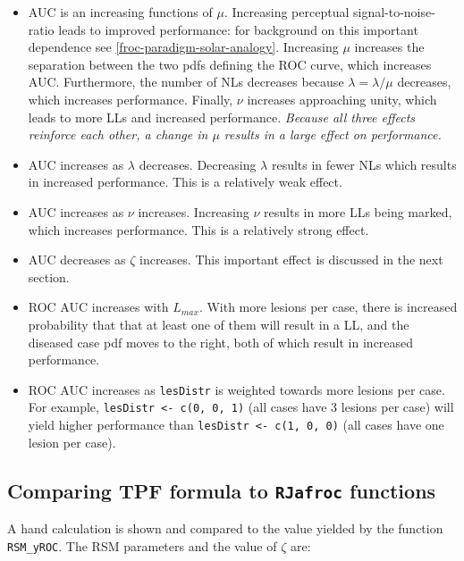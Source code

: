 \documentclass[
]{book}
\begin{document}
\begin{itemize}
\item
  AUC is an increasing functions of \(\mu\). Increasing perceptual signal-to-noise-ratio leads to improved performance: for background on this important dependence see \ref{froc-paradigm-solar-analogy}. Increasing \(\mu\) increases the separation between the two pdfs defining the ROC curve, which increases AUC. Furthermore, the number of NLs decreases because \(\lambda = \lambda / \mu\) decreases, which increases performance. Finally, \(\nu\) increases approaching unity, which leads to more LLs and increased performance. \emph{Because all three effects reinforce each other, a change in \(\mu\) results in a large effect on performance.}
\item
  AUC increases as \(\lambda\) decreases. Decreasing \(\lambda\) results in fewer NLs which results in increased performance. This is a relatively weak effect.
\item
  AUC increases as \(\nu\) increases. Increasing \(\nu\) results in more LLs being marked, which increases performance. This is a relatively strong effect.
\item
  AUC decreases as \(\zeta\) increases. This important effect is discussed in the next section.
\item
  ROC AUC increases with \(L_{max}\). With more lesions per case, there is increased probability that that at least one of them will result in a LL, and the diseased case pdf moves to the right, both of which result in increased performance.
\item
  ROC AUC increases as \texttt{lesDistr} is weighted towards more lesions per case. For example, \texttt{lesDistr\ \textless{}-\ c(0,\ 0,\ 1)} (all cases have 3 lesions per case) will yield higher performance than \texttt{lesDistr\ \textless{}-\ c(1,\ 0,\ 0)} (all cases have one lesion per case).
\end{itemize}

\hypertarget{comparing-tpf-formula-to-rjafroc-functions}{%
\subsection{\texorpdfstring{Comparing TPF formula to \texttt{RJafroc} functions}{Comparing TPF formula to RJafroc functions}}\label{comparing-tpf-formula-to-rjafroc-functions}}

A hand calculation is shown and compared to the value yielded by the function \texttt{RSM\_yROC}. The RSM parameters and the value of \(\zeta\) are:
\end{document}
